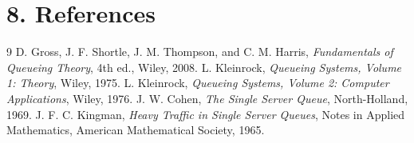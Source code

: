 \section*{8. References}
\begin{thebibliography}{9}
 D. Gross, J. F. Shortle, J. M. Thompson, and C. M. Harris, \emph{Fundamentals of Queueing Theory}, 4th ed., Wiley, 2008.
 L. Kleinrock, \emph{Queueing Systems, Volume 1: Theory}, Wiley, 1975.
 L. Kleinrock, \emph{Queueing Systems, Volume 2: Computer Applications}, Wiley, 1976.
 J. W. Cohen, \emph{The Single Server Queue}, North-Holland, 1969.
 J. F. C. Kingman, \emph{Heavy Traffic in Single Server Queues}, Notes in Applied Mathematics, American Mathematical Society, 1965.
\end{thebibliography}
